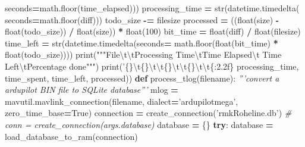 \documentclass[12pt,oneside]{reedthesis}
\newenvironment{Shaded}{\begin{snugshade}}{\end{snugshade}}
\newcommand{\KeywordTok}[1]{\textcolor[rgb]{0.13,0.29,0.53}{\textbf{#1}}}
\newcommand{\DecValTok}[1]{\textcolor[rgb]{0.00,0.00,0.81}{#1}}
\newcommand{\CharTok}[1]{\textcolor[rgb]{0.31,0.60,0.02}{#1}}
\newcommand{\SpecialCharTok}[1]{\textcolor[rgb]{0.00,0.00,0.00}{#1}}
\newcommand{\StringTok}[1]{\textcolor[rgb]{0.31,0.60,0.02}{#1}}
\newcommand{\CommentTok}[1]{\textcolor[rgb]{0.56,0.35,0.01}{\textit{#1}}}
\newcommand{\VariableTok}[1]{\textcolor[rgb]{0.00,0.00,0.00}{#1}}
\newcommand{\ControlFlowTok}[1]{\textcolor[rgb]{0.13,0.29,0.53}{\textbf{#1}}}
\newcommand{\OperatorTok}[1]{\textcolor[rgb]{0.81,0.36,0.00}{\textbf{#1}}}
\newcommand{\BuiltInTok}[1]{#1}
\newcommand{\NormalTok}[1]{#1}
\theoremstyle{definition}
\theoremstyle{definition}
\theoremstyle{definition}
\theoremstyle{remark}
\begin{document}
\begin{Shaded}
\begin{Highlighting}[]
\NormalTok{                  seconds}\OperatorTok{=}\NormalTok{math.floor(time_elapsed)))}
\NormalTok{                processing_time }\OperatorTok{=} \BuiltInTok{str}\NormalTok{(datetime.timedelta(}
\NormalTok{                  seconds}\OperatorTok{=}\NormalTok{math.floor(diff)))}
\NormalTok{                todo_size }\OperatorTok{-=}\NormalTok{ filesize}
\NormalTok{                processed }\OperatorTok{=}\NormalTok{ ((}\BuiltInTok{float}\NormalTok{(size) }\OperatorTok{-} \BuiltInTok{float}\NormalTok{(todo_size)) }\OperatorTok{/} 
                  \BuiltInTok{float}\NormalTok{(size)) }\OperatorTok{*} \BuiltInTok{float}\NormalTok{(}\DecValTok{100}\NormalTok{)}
\NormalTok{                bit_time }\OperatorTok{=} \BuiltInTok{float}\NormalTok{(diff) }\OperatorTok{/} \BuiltInTok{float}\NormalTok{(filesize)}
\NormalTok{                time_left }\OperatorTok{=} \BuiltInTok{str}\NormalTok{(datetime.timedelta(seconds}\OperatorTok{=}
\NormalTok{                  math.floor(}\BuiltInTok{float}\NormalTok{(bit_time) }\OperatorTok{*} \BuiltInTok{float}\NormalTok{(todo_size))))}
                \BuiltInTok{print}\NormalTok{(}\StringTok{"""File}\CharTok{\textbackslash{}t\textbackslash{}t}\StringTok{Processing Time}\CharTok{\textbackslash{}t}\StringTok{Time Elapsed}\CharTok{\textbackslash{}t}
\StringTok{                  Time Left}\CharTok{\textbackslash{}t}\StringTok{Percentage done"""}\NormalTok{)}
                \BuiltInTok{print}\NormalTok{(}\StringTok{'}\SpecialCharTok{\{\}}\CharTok{\textbackslash{}t}\SpecialCharTok{\{\}}\CharTok{\textbackslash{}t\textbackslash{}t}\SpecialCharTok{\{\}}\CharTok{\textbackslash{}t\textbackslash{}t}\SpecialCharTok{\{\}}\CharTok{\textbackslash{}t\textbackslash{}t}\SpecialCharTok{\{:2.2f\}}\StringTok{%
\NormalTok{                  processing_time, time_spent, time_left, processed))}
\KeywordTok{def}\NormalTok{ process_tlog(filename):}
    \CommentTok{'''convert a ardupilot BIN file to SQLite database'''}
\NormalTok{    mlog }\OperatorTok{=}\NormalTok{ mavutil.mavlink_connection(filename, dialect}\OperatorTok{=}\StringTok{'ardupilotmega'}\NormalTok{, }
\NormalTok{      zero_time_base}\OperatorTok{=}\VariableTok{True}\NormalTok{)}
\NormalTok{    connection }\OperatorTok{=}\NormalTok{ create_connection(}\StringTok{'rmkRoheline.db'}\NormalTok{)}
    \CommentTok{# conn = create_connection(args.database)}
\NormalTok{    database }\OperatorTok{=}\NormalTok{ \{\}}
    \ControlFlowTok{try}\NormalTok{:}
\NormalTok{        database }\OperatorTok{=}\NormalTok{ load_database_to_ram(connection)}
}
\end{Highlighting}
\end{Shaded}
\end{document}
